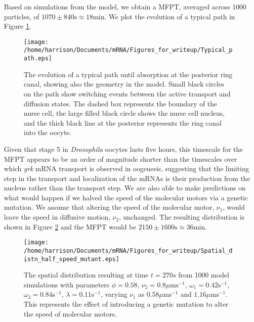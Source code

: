 \documentclass[twocolumn]{biophys}
\begin{document}
Based on simulations from the model, we obtain a MFPT, averaged across 1000 particles, of $1070 \pm 840 \text{s} \approx 18 \text{min}$.
We plot the evolution of a typical path in Figure \ref{FIG:Typical_path}.
\begin{figure}[h]
 \centering
 \texttt{[image: /home/harrison/Documents/mRNA/Figures\_for\_writeup/Typical\_path.eps]}
 \caption{The evolution of a typical path until absorption at the posterior ring canal, showing also the geometry in the model. Small black circles on the path show switching events between the active transport and diffusion states. The dashed box represents the boundary of the nurse cell, the large filled black circle shows the nurse cell nucleus, and the thick black line at the posterior represents the ring canal into the oocyte.}
 \label{FIG:Typical_path}
\end{figure}
Given that stage 5 in \textit{Drosophila} oocytes lasts five hours, this timescale for the MFPT appears to be an order of magnitude shorter than the timescales over which \textit{grk} mRNA transport is observed in oogenesis, suggesting that the limiting step in the transport and localization of the mRNAs is their production from the nucleus rather than the transport step.
We are also able to make predictions on what would happen if we halved the speed of the molecular motors via a genetic mutation.
We assume that altering the speed of the molecular motor, $\nu_1$, would leave the speed in diffusive motion, $\nu_2$, unchanged.
The resulting distribution is shown in Figure \ref{FIG:Half_speed_q} and the MFPT would be $2150\pm1600 \text{s} \approx 36\text{min}$.
\begin{figure}[h]
 \centering
 \texttt{[image: /home/harrison/Documents/mRNA/Figures\_for\_writeup/Spatial\_distn\_half\_speed\_mutant.eps]}
 \caption{The spatial distribution resulting at time $t=270s$ from 1000 model simulations with parameters $\phi=0.58$, $\nu_2=0.8 \mu \text{ms}^{-1}$, $\omega_1=0.42 \text{s}^{-1}$, $\omega_2=0.84 \text{s}^{-1}$, $\lambda=0.11 \text{s}^{-1}$, varying $\nu_1$ as $0.58\mu \text{ms}^{-1}$ and $1.16\mu \text{ms}^{-1}$. 
 This represents the effect of introducing a genetic mutation to alter the speed of molecular motors.}
 \label{FIG:Half_speed_q}
\end{figure}
\end{document}
